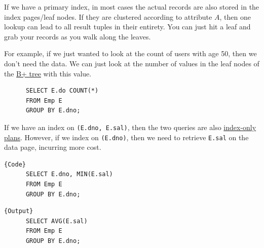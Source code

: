   \begin{example}
    \label{ex:primary-index-clustered-according-to-search-key}
    If we have a primary index, in most cases the actual records are also stored in the index pages/leaf nodes. If they are clustered according to attribute $A$, then one lookup can lead to all result tuples in their entirety. You can just hit a leaf and grab your records as you walk along the leaves. 
  \end{example}

  \begin{example}
    \label{ex:other-index-only-queries}
    For example, if we just wanted to look at the count of users with age 50, then we don't need the data. We can just look at the number of values in the leaf nodes of the \hyperref[def:b-tree-2]{B+ tree} with this value. 
    \begin{lstlisting}
      SELECT E.do COUNT(*) 
      FROM Emp E 
      GROUP BY E.dno;
    \end{lstlisting}

    If we have an index on \texttt{(E.dno, E.sal)}, then the two queries are also \hyperref[def:index-only-plans]{index-only plans}. However, if we index on \texttt{(E.dno)}, then we need to retrieve \texttt{E.sal} on the data page, incurring more cost. 

    \noindent\begin{minipage}{.5\textwidth}
    \begin{lstlisting}[]{Code}
      SELECT E.dno, MIN(E.sal) 
      FROM Emp E 
      GROUP BY E.dno; 
    \end{lstlisting}
    \end{minipage}
    \hfill
    \begin{minipage}{.49\textwidth}
    \begin{lstlisting}[]{Output}
      SELECT AVG(E.sal) 
      FROM Emp E 
      GROUP BY E.dno;
    \end{lstlisting}
    \end{minipage}
  \end{example}

